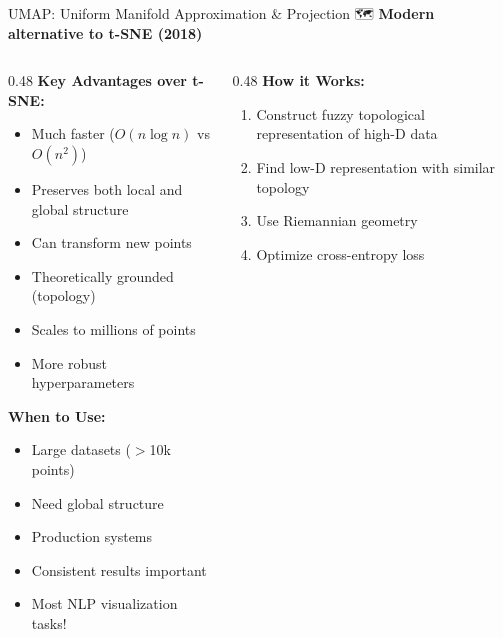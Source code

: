 \documentclass[aspectratio=169]{beamer}
\begin{document}
\begin{frame}[shrink=10]{UMAP: Uniform Manifold Approximation \& Projection 🗺️}
\textbf{Modern alternative to t-SNE (2018)}

\vspace{1em}

\begin{columns}[T]
\begin{column}{0.48\textwidth}
\textbf{Key Advantages over t-SNE:}
\begin{itemize}\setlength{\itemsep}{0pt}
    \item \alert{Much faster} ($O(n \log n)$ vs $O(n^2)$)
    \item Preserves \alert{both} local and global structure
    \item Can transform new points
    \item Theoretically grounded (topology)
    \item Scales to millions of points
    \item More robust hyperparameters
\end{itemize}

\vspace{0.5em}
\textbf{When to Use:}
\begin{itemize}\setlength{\itemsep}{0pt}
    \item Large datasets ($>$10k points)
    \item Need global structure
    \item Production systems
    \item Consistent results important
    \item Most NLP visualization tasks!
\end{itemize}
\end{column}

\begin{column}{0.48\textwidth}
\textbf{How it Works:}

\vspace{0.3em}
\begin{enumerate}\setlength{\itemsep}{0pt}
    \item Construct fuzzy topological representation of high-D data
    \item Find low-D representation with similar topology
    \item Use Riemannian geometry
    \item Optimize cross-entropy loss
\end{enumerate}


\end{column}
\end{columns}
\end{frame}
\end{document}
